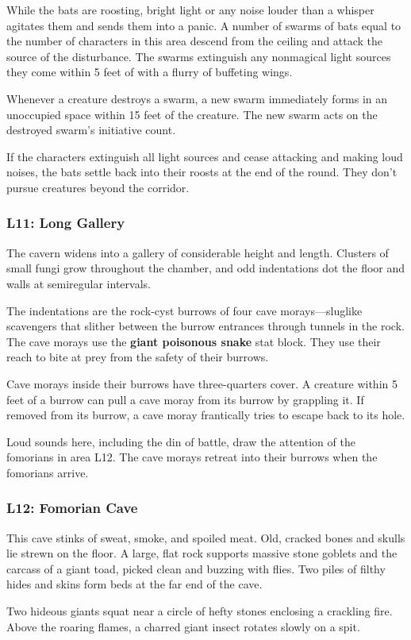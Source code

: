 \documentclass[10pt,a4paper,twoside,bg=print,twocolumn,openany,nodeprecatedcode]{dndbook}
\begin{document}
While the bats are roosting, bright light or any noise louder than a whisper agitates them and sends them into a panic. A number of swarms of bats equal to the number of characters in this area descend from the ceiling and attack the source of the disturbance. The swarms extinguish any nonmagical light sources they come within 5 feet of with a flurry of buffeting wings.

Whenever a creature destroys a swarm, a new swarm immediately forms in an unoccupied space within 15 feet of the creature. The new swarm acts on the destroyed swarm's initiative count.

If the characters extinguish all light sources and cease attacking and making loud noises, the bats settle back into their roosts at the end of the round. They don't pursue creatures beyond the corridor.

\subsubsection{L11: Long Gallery}
\begin{DndReadAloud}{}
The cavern widens into a gallery of considerable height and length. Clusters of small fungi grow throughout the chamber, and odd indentations dot the floor and walls at semiregular intervals.

\end{DndReadAloud}

The indentations are the rock-cyst burrows of four cave morays—sluglike scavengers that slither between the burrow entrances through tunnels in the rock. The cave morays use the \textbf{giant poisonous snake} stat block. They use their reach to bite at prey from the safety of their burrows.

Cave morays inside their burrows have three-quarters cover. A creature within 5 feet of a burrow can pull a cave moray from its burrow by grappling it. If removed from its burrow, a cave moray frantically tries to escape back to its hole.

Loud sounds here, including the din of battle, draw the attention of the fomorians in area L12. The cave morays retreat into their burrows when the fomorians arrive.

\subsubsection{L12: Fomorian Cave}
\begin{DndReadAloud}{}
This cave stinks of sweat, smoke, and spoiled meat. Old, cracked bones and skulls lie strewn on the floor. A large, flat rock supports massive stone goblets and the carcass of a giant toad, picked clean and buzzing with flies. Two piles of filthy hides and skins form beds at the far end of the cave.

Two hideous giants squat near a circle of hefty stones enclosing a crackling fire. Above the roaring flames, a charred giant insect rotates slowly on a spit.

\end{DndReadAloud}
\end{document}
